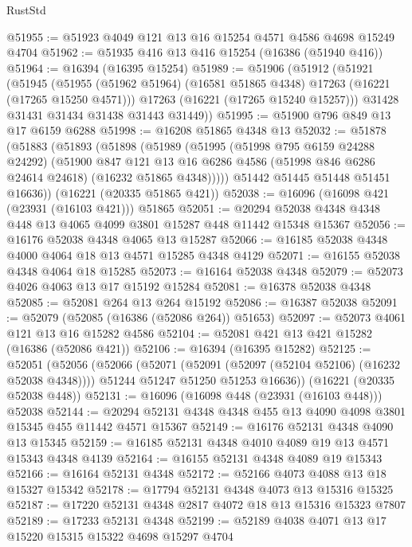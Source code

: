 \begin{lexlean}{RustStd}
\begin{coremodule}
@51955 := @51923 @4049 @121 @13 @16 @15254 @4571 @4586 @4698 @15249 @4704
@51962 := @51935 @416 @13 @416 @15254 (@16386 (@51940 @416))
@51964 := @16394 (@16395 @15254)
@51989 := @51906
    (@51912
      (@51921
        (@51945
          (@51955 (@51962 @51964) (@16581 @51865 @4348) @17263 (@16221 (@17265 @15250 @4571)))
          @17263
          (@16221 (@17265 @15240 @15257)))
        @31428
        @31431
        @31434
        @31438
        @31443
        @31449))
@51995 := @51900 @796 @849 @13 @17 @6159 @6288
@51998 := @16208 @51865 @4348 @13
@52032 := @51878
    (@51883
      (@51893
        (@51898
          (@51989
            (@51995
              (@51998 @795 @6159 @24288 @24292)
              (@51900
                @847
                @121
                @13
                @16
                @6286
                @4586
                (@51998 @846 @6286 @24614 @24618)
                (@16232 @51865 @4348)))))
        @51442
        @51445
        @51448
        @51451
        @16636))
    (@16221 (@20335 @51865 @421))
@52038 := @16096 (@16098 @421 (@23931 (@16103 @421))) @51865
@52051 := @20294 @52038 @4348 @4348 @448 @13 @4065 @4099 @3801 @15287 @448 @11442 @15348 @15367
@52056 := @16176 @52038 @4348 @4065 @13 @15287
@52066 := @16185 @52038 @4348 @4000 @4064 @18 @13 @4571 @15285 @4348 @4129
@52071 := @16155 @52038 @4348 @4064 @18 @15285
@52073 := @16164 @52038 @4348
@52079 := @52073 @4026 @4063 @13 @17 @15192 @15284
@52081 := @16378 @52038 @4348
@52085 := @52081 @264 @13 @264 @15192
@52086 := @16387 @52038
@52091 := @52079 (@52085 (@16386 (@52086 @264)) @51653)
@52097 := @52073 @4061 @121 @13 @16 @15282 @4586
@52104 := @52081 @421 @13 @421 @15282 (@16386 (@52086 @421))
@52106 := @16394 (@16395 @15282)
@52125 := @52051
    (@52056
      (@52066
        (@52071 (@52091 (@52097 (@52104 @52106) (@16232 @52038 @4348))))
        @51244
        @51247
        @51250
        @51253
        @16636))
    (@16221 (@20335 @52038 @448))
@52131 := @16096 (@16098 @448 (@23931 (@16103 @448))) @52038
@52144 := @20294 @52131 @4348 @4348 @455 @13 @4090 @4098 @3801 @15345 @455 @11442 @4571 @15367
@52149 := @16176 @52131 @4348 @4090 @13 @15345
@52159 := @16185 @52131 @4348 @4010 @4089 @19 @13 @4571 @15343 @4348 @4139
@52164 := @16155 @52131 @4348 @4089 @19 @15343
@52166 := @16164 @52131 @4348
@52172 := @52166 @4073 @4088 @13 @18 @15327 @15342
@52178 := @17794 @52131 @4348 @4073 @13 @15316 @15325
@52187 := @17220 @52131 @4348 @2817 @4072 @18 @13 @15316 @15323 @7807
@52189 := @17233 @52131 @4348
@52199 := @52189 @4038 @4071 @13 @17 @15220 @15315 @15322 @4698 @15297 @4704

\end{coremodule}
\end{lexlean}
